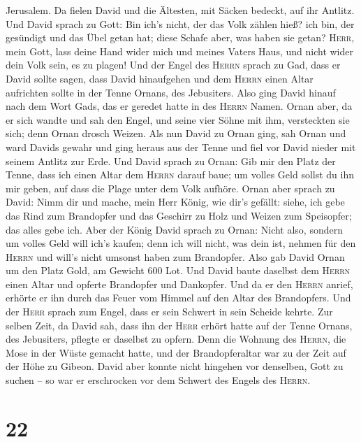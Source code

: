 Jerusalem. Da fielen David und die Ältesten, mit Säcken bedeckt, auf ihr
Antlitz.  Und David sprach zu Gott: Bin ich's nicht, der
das Volk zählen hieß? ich bin, der gesündigt und das Übel getan hat;
diese Schafe aber, was haben sie getan? \textsc{Herr}, mein Gott, lass
deine Hand wider mich und meines Vaters Haus, und nicht wider dein Volk
sein, es zu plagen!  Und der Engel des \textsc{Herrn}
sprach zu Gad, dass er David sollte sagen, dass David hinaufgehen und
dem \textsc{Herrn} einen Altar aufrichten sollte in der Tenne Ornans,
des Jebusiters.  Also ging David hinauf nach dem Wort
Gads, das er geredet hatte in des \textsc{Herrn} Namen. 
Ornan aber, da er sich wandte und sah den Engel, und seine vier Söhne
mit ihm, versteckten sie sich; denn Ornan drosch Weizen. 
Als nun David zu Ornan ging, sah Ornan und ward Davids gewahr und ging
heraus aus der Tenne und fiel vor David nieder mit seinem Antlitz zur
Erde.  Und David sprach zu Ornan: Gib mir den Platz der
Tenne, dass ich einen Altar dem \textsc{Herrn} darauf baue; um volles
Geld sollst du ihn mir geben, auf dass die Plage unter dem Volk aufhöre.
 Ornan aber sprach zu David: Nimm dir und mache, mein
Herr König, wie dir's gefällt: siehe, ich gebe das Rind zum Brandopfer
und das Geschirr zu Holz und Weizen zum Speisopfer; das alles gebe ich.
 Aber der König David sprach zu Ornan: Nicht also,
sondern um volles Geld will ich's kaufen; denn ich will nicht, was dein
ist, nehmen für den \textsc{Herrn} und will's nicht umsonst haben zum
Brandopfer.  Also gab David Ornan um den Platz Gold, am
Gewicht 600 Lot.  Und David baute daselbst dem
\textsc{Herrn} einen Altar und opferte Brandopfer und Dankopfer. Und da
er den \textsc{Herrn} anrief, erhörte er ihn durch das Feuer vom Himmel
auf den Altar des Brandopfers.  Und der \textsc{Herr}
sprach zum Engel, dass er sein Schwert in sein Scheide kehrte.
 Zur selben Zeit, da David sah, dass ihn der
\textsc{Herr} erhört hatte auf der Tenne Ornans, des Jebusiters, pflegte
er daselbst zu opfern.  Denn die Wohnung des
\textsc{Herrn}, die Mose in der Wüste gemacht hatte, und der
Brandopferaltar war zu der Zeit auf der Höhe zu Gibeon. 
David aber konnte nicht hingehen vor denselben, Gott zu suchen -- so war
er erschrocken vor dem Schwert des Engels des \textsc{Herrn}.

\hypertarget{section-21}{%
\section{22}\label{section-21}}

